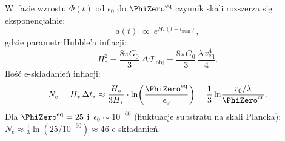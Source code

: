 \begin{proposition}\label{prop:inflation-TGP}
W~fazie wzrostu $\Phi(t)$ od $\epsilon_0$ do $\PhiZero^{\mathrm{eq}}$
czynnik skali rozszerza si\k{e} eksponencjalnie:
\begin{equation}\label{eq:scale-factor-inflation}
    a(t) \;\propto\; e^{H_* (t - t_\mathrm{nukl})},
\end{equation}
gdzie parametr Hubble'a inflacji:
\begin{equation}\label{eq:H-inflation-TGP}
    H_*^2
    = \frac{8\pi G_0}{3}\,\Delta\mathcal{F}_\mathrm{obj}
    = \frac{8\pi G_0}{3}\,\frac{\lambda\,v_{\mathrm{eq}}^4}{4}.
\end{equation}
Ilo\'s\'c e-sk\l{}adanie\'n inflacji:
\begin{equation}\label{eq:N-efolds}
    N_e = H_*\,\Delta t_*
    \approx \frac{H_*}{3H_*}
    \cdot \ln\!\left(\frac{\PhiZero^{\mathrm{eq}}}{\epsilon_0}\right)
    = \frac{1}{3}\ln\!\frac{r_0/\lambda}{\PhiZero^{\mathrm{cr}}}.
\end{equation}
Dla $\PhiZero^{\mathrm{eq}} = 25$ i~$\epsilon_0 \sim 10^{-60}$
(fluktuacje substratu na skali Plancka):
$N_e \approx \tfrac{1}{3}\ln(25/10^{-60}) \approx 46$ e-sk\l{}adanie\'n.
\end{proposition}

